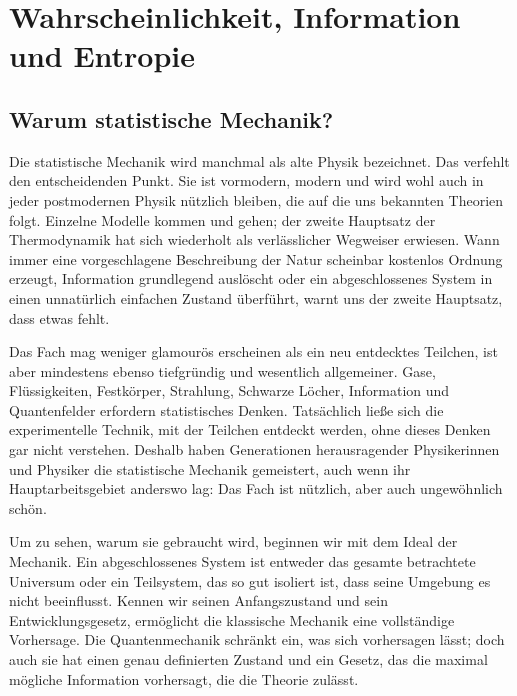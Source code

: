 \chapter{Wahrscheinlichkeit, Information und Entropie}


\section{Warum statistische Mechanik?}

Die statistische Mechanik wird manchmal als alte Physik bezeichnet. Das verfehlt den entscheidenden Punkt. Sie ist vormodern, modern und wird wohl auch in jeder postmodernen Physik nützlich bleiben, die auf die uns bekannten Theorien folgt. Einzelne Modelle kommen und gehen; der zweite Hauptsatz der Thermodynamik hat sich wiederholt als verlässlicher Wegweiser erwiesen. Wann immer eine vorgeschlagene Beschreibung der Natur scheinbar kostenlos Ordnung erzeugt, Information grundlegend auslöscht oder ein abgeschlossenes System in einen unnatürlich einfachen Zustand überführt, warnt uns der zweite Hauptsatz, dass etwas fehlt.

Das Fach mag weniger glamourös erscheinen als ein neu entdecktes Teilchen, ist aber mindestens ebenso tiefgründig und wesentlich allgemeiner. Gase, Flüssigkeiten, Festkörper, Strahlung, Schwarze Löcher, Information und Quantenfelder erfordern statistisches Denken. Tatsächlich ließe sich die experimentelle Technik, mit der Teilchen entdeckt werden, ohne dieses Denken gar nicht verstehen. Deshalb haben Generationen herausragender Physikerinnen und Physiker die statistische Mechanik gemeistert, auch wenn ihr Hauptarbeitsgebiet anderswo lag: Das Fach ist nützlich, aber auch ungewöhnlich schön.

Um zu sehen, warum sie gebraucht wird, beginnen wir mit dem Ideal der Mechanik. Ein abgeschlossenes System ist entweder das gesamte betrachtete Universum oder ein Teilsystem, das so gut isoliert ist, dass seine Umgebung es nicht beeinflusst. Kennen wir seinen Anfangszustand und sein Entwicklungsgesetz, ermöglicht die klassische Mechanik eine vollständige Vorhersage. Die Quantenmechanik schränkt ein, was sich vorhersagen lässt; doch auch sie hat einen genau definierten Zustand und ein Gesetz, das die maximal mögliche Information vorhersagt, die die Theorie zulässt.

